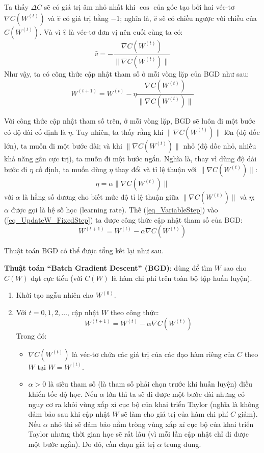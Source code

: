 Ta thấy $\Delta C$ sẽ có giá trị âm nhỏ nhất khi $\cos$ của góc tạo bởi hai véc-tơ $\nabla C(W^{(t)})$ và $\hat{v}$ có giá trị bằng $-1$; nghĩa là, $\hat{v}$ sẽ có chiều ngược với chiều của $C(W^{(t)})$. Và vì $\hat{v}$ là véc-tơ đơn vị nên cuối cùng ta có:
\begin{equation}
	\hat{v} = -\frac{\nabla C(W^{(t)})}{\|\nabla C(W^{(t)})\|}
\end{equation}
Như vậy, ta có công thức cập nhật tham số ở mỗi vòng lặp của BGD như sau:
\begin{equation}
	W^{(t+1)} = W^{(t)} -\eta \frac{\nabla C(W^{(t)})}{\|\nabla C(W^{(t)})\|}
	\label{eq_UpdateW_FixedStep}
\end{equation}

Với công thức cập nhật tham số trên, ở mỗi vòng lặp, BGD sẽ luôn đi một bước có độ dài cố định là $\eta$. Tuy nhiên, ta thấy rằng khi $\|\nabla C(W^{(t)})\|$ lớn (độ dốc lớn), ta muốn đi một bước dài; và khi $\|\nabla C(W^{(t)})\|$ nhỏ (độ dốc nhỏ, nhiều khả năng gần cực trị), ta muốn đi một bước ngắn. Nghĩa là, thay vì dùng độ dài bước đi $\eta$ cố định, ta muốn dùng $\eta$ thay đổi và tỉ lệ thuận với $\|\nabla C(W^{(t)})\|$:
\begin{equation}
	\eta = \alpha \|\nabla C(W^{(t)})\|
	\label{eq_VariableStep}
\end{equation}
với $\alpha$ là hằng số dương cho biết mức độ tỉ lệ thuận giữa $\|\nabla C(W^{(t)})\|$ và $\eta$; $\alpha$ được gọi là hệ số học (learning rate). Thế (\ref{eq_VariableStep}) vào (\ref{eq_UpdateW_FixedStep}) ta được công thức cập nhật tham số của BGD:
\begin{equation}
	W^{(t+1)} = W^{(t)} - \alpha \nabla C(W^{(t)})
	\label{eq_UpdateW_VariabeStep}
\end{equation}

Thuật toán BGD có thể được tổng kết lại như sau.
\begin{leftbar}
\textbf{Thuật toán ``Batch Gradient Descent'' (BGD)}: dùng để tìm $W$ sao cho $C(W)$ đạt cực tiểu (với $C(W)$ là hàm chi phí trên toàn bộ tập huấn luyện).
	\begin{enumerate}
		\item Khởi tạo ngẫu nhiên cho $W^{(0)}$.
		\item Với $t=0,1,2,\ldots$, cập nhật $W$ theo công thức:
		\[
			W^{(t+1)} = W^{(t)} - \alpha \nabla C(W^{(t)})
		\]
		Trong đó:
		\begin{itemize}
			\item $\nabla C(W^{(t)})$ là véc-tơ chứa các giá trị của các đạo hàm riêng của $C$ theo $W$ tại $W=W^{(t)}$.
			\item $\alpha > 0$ là siêu tham số (là tham số phải chọn trước khi huấn luyện) điều khiển tốc độ học. Nếu $\alpha$ lớn thì ta sẽ đi được một bước dài nhưng có nguy cơ ra khỏi vùng xấp xỉ cục bộ của khai triển Taylor (nghĩa là không đảm bảo sau khi cập nhật $W$ sẽ làm cho giá trị của hàm chi phí $C$ giảm). Nếu $\alpha$ nhỏ thì sẽ đảm bảo nằm tròng vùng xấp xỉ cục bộ của khai triển Taylor nhưng thời gian học sẽ rất lâu (vì mỗi lần cập nhật chỉ đi được một bước ngắn). Do đó, cần chọn giá trị $\alpha$ trung dung.
		\end{itemize}
	\end{enumerate}
\end{leftbar}

